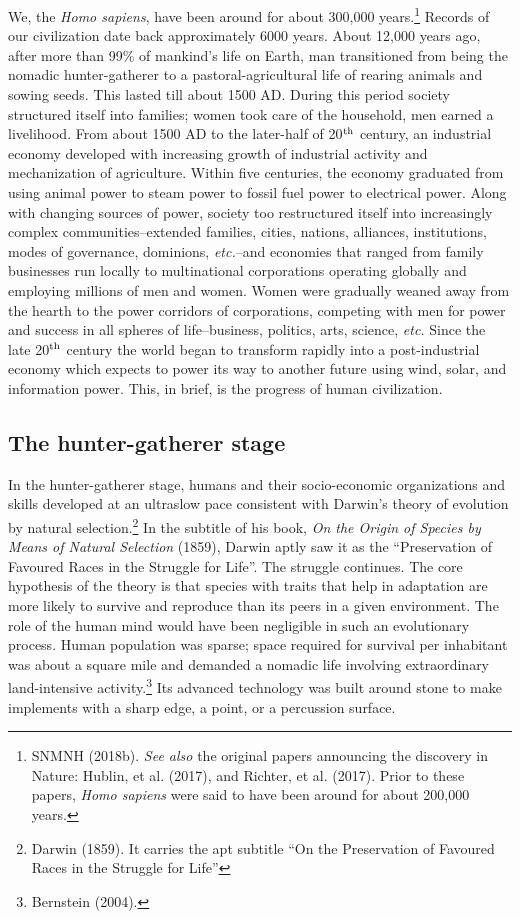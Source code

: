 \begin{multicols}{2}
We, the \textit{Homo sapiens}, have been around for about 300,000 years.\footnote{SNMNH (2018b). \textit{See also} the original papers announcing the discovery in Nature: Hublin, et al. (2017), and Richter, et al. (2017). Prior to these papers, \textit{Homo sapiens} were said to have been around for about 200,000 years.} Records of our civilization date back approximately 6000 years. About 12,000 years ago, after more than 99\% of mankind's life on Earth, man transitioned from being the nomadic hunter-gatherer to a pastoral-agricultural life of rearing animals and sowing seeds. This lasted till about 1500 AD. During this period society structured itself into families; women took care of the household, men earned a livelihood. From about 1500 AD to the later-half of 20$^{\rm th}$ century, an industrial economy developed with increasing growth of industrial activity and mechanization of agriculture. Within five centuries, the economy graduated from using animal power to steam power to fossil fuel power to electrical power. Along with changing sources of power, society too restructured itself into increasingly complex communities--extended families, cities, nations, alliances, institutions, modes of governance, dominions, \textit{etc.}--and economies that ranged from family businesses run locally to multinational corporations operating globally and employing millions of men and women. Women were gradually weaned away from the hearth to the power corridors of corporations, competing with men for power and success in all spheres of life--business, politics, arts, science, \textit{etc.} Since the late 20$^{\rm th}$ century the world began to transform rapidly into a post-industrial economy which expects to power its way to another future using wind, solar, and information power. This, in brief, is the progress of human civilization.

\subsection*{The hunter-gatherer stage}

In the hunter-gatherer stage, humans and their socio-economic organizations and skills developed at an ultraslow pace consistent with Darwin's theory of evolution by natural selection.\footnote{Darwin (1859). It carries the apt subtitle “On the Preservation of Favoured Races in the Struggle for Life”} In the subtitle of his book, \textit{On the Origin of Species by Means of Natural Selection} (1859), Darwin aptly saw it as the “Preservation of Favoured Races in the Struggle for Life”. The struggle continues. The core hypothesis of the theory is that species with traits that help in adaptation are more likely to survive and reproduce than its peers in a given environment. The role of the human mind would have been negligible in such an evolutionary process. Human population was sparse; space required for survival per inhabitant was about a square mile and demanded a nomadic life involving extraordinary land-intensive activity.\footnote{Bernstein (2004).} Its advanced technology was built around stone to make implements with a sharp edge, a point, or a percussion surface.


\end{multicols}
